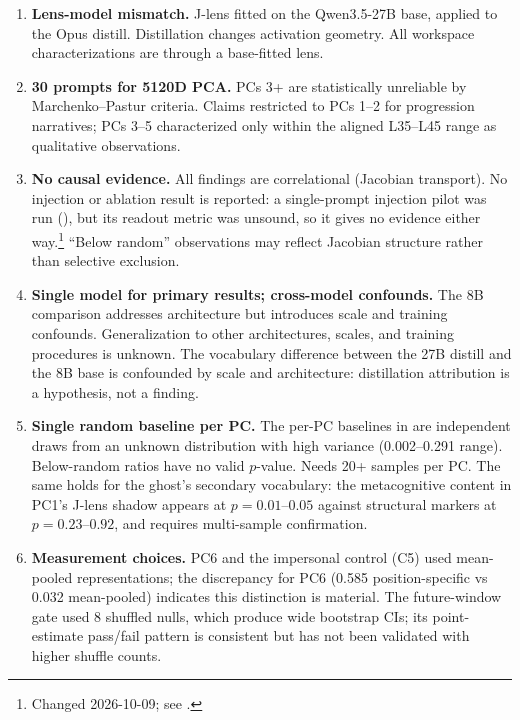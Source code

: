 \documentclass[11pt,a4paper]{article}
\begin{document}
\begin{enumerate}
  \item\label{lim:lens} \textbf{Lens-model mismatch.} J-lens fitted on the Qwen3.5-27B base, applied to the Opus distill. Distillation changes activation geometry. All workspace characterizations are through a base-fitted lens.

  \item\label{lim:prompts} \textbf{30 prompts for 5120D PCA.} PCs 3+ are statistically unreliable by Marchenko--Pastur criteria. Claims restricted to PCs 1--2 for progression narratives; PCs 3--5 characterized only within the aligned L35--L45 range as qualitative observations.

  \item\label{lim:causal} \textbf{No causal evidence.} All findings are correlational (Jacobian transport). No injection or ablation result is reported: a single-prompt injection pilot was run (), but its readout metric was unsound, so it gives no evidence either way.\footnote{Changed 2026-10-09; see .} ``Below random'' observations may reflect Jacobian structure rather than selective exclusion.

  \item\label{lim:models} \textbf{Single model for primary results; cross-model confounds.} The 8B comparison addresses architecture but introduces scale and training confounds. Generalization to other architectures, scales, and training procedures is unknown. The vocabulary difference between the 27B distill and the 8B base is confounded by scale and architecture: distillation attribution is a hypothesis, not a finding.

  \item\label{lim:baselines} \textbf{Single random baseline per PC.} The per-PC baselines in  are independent draws from an unknown distribution with high variance (0.002--0.291 range). Below-random ratios have no valid $p$-value. Needs 20+ samples per PC. The same holds for the ghost's secondary vocabulary: the metacognitive content in PC1's J-lens shadow appears at $p = 0.01$--$0.05$ against structural markers at $p = 0.23$--$0.92$, and requires multi-sample confirmation.

  \item\label{lim:measurement} \textbf{Measurement choices.} PC6 and the impersonal control (C5) used mean-pooled representations; the discrepancy for PC6 (0.585 position-specific vs 0.032 mean-pooled) indicates this distinction is material. The future-window gate used 8 shuffled nulls, which produce wide bootstrap CIs; its point-estimate pass/fail pattern is consistent but has not been validated with higher shuffle counts.
\end{enumerate}
\end{document}
